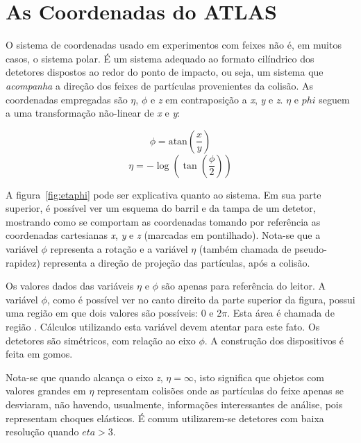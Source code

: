 \typeout{ ====================================================================}
\typeout{ ====================================================================}

\chapter{As Coordenadas do ATLAS}
\label{ap:coord}

O sistema de coordenadas usado em experimentos com feixes não é, em muitos
casos, o sistema polar. É um sistema adequado ao formato cilíndrico dos
detetores dispostos ao redor do ponto de impacto, ou seja, um sistema que
\emph{acompanha} a direção dos feixes de partículas provenientes da
colisão. As coordenadas empregadas são $\eta$, $\phi$ e \textit{z} em
contraposição a \textit{x}, \textit{y} e \textit{z}. $\eta$ e $phi$ seguem a
uma transformação não-linear de \textit{x} e \textit{y}:

\begin{equation}
\phi = \text{atan}({\frac{x}{y}})
\end{equation}
\begin{equation}
\eta = - \log({\tan({\frac{\phi}{2}})})
\end{equation}

A figura~\ref{fig:etaphi} pode ser explicativa quanto ao sistema. Em sua parte
superior, é possível ver um esquema do barril e da tampa de um detetor,
mostrando como se comportam as coordenadas tomando por referência as
coordenadas cartesianas \textit{x}, \textit{y} e \textit{z} (marcadas em
pontilhado). Nota-se que a variável $\phi$ representa a rotação e a variável
$\eta$ (também chamada de pseudo-rapidez) representa a
direção de projeção das partículas, após a colisão.

Os valores dados das variáveis $\eta$ e $\phi$ são apenas para referência do
leitor. A variável $\phi$, como é possível ver no canto direito da parte
superior da figura, possui uma região em que dois valores são possíveis: 0 e
2$\pi$. Esta área é chamada de região . Cálculos utilizando
esta variável devem atentar para este fato. Os detetores são simétricos, com
relação ao eixo $\phi$. A construção dos dispositivos é feita em gomos.

Nota-se que quando alcança o eixo \textit{z}, $\eta = \infty$, isto significa
que objetos com valores grandes em $\eta$ representam colisões onde as
partículas do feixe apenas se desviaram, não havendo, usualmente, informações
interessantes de análise, pois representam choques elásticos. É comum
utilizarem-se detetores com baixa resolução quando $eta > 3$.

